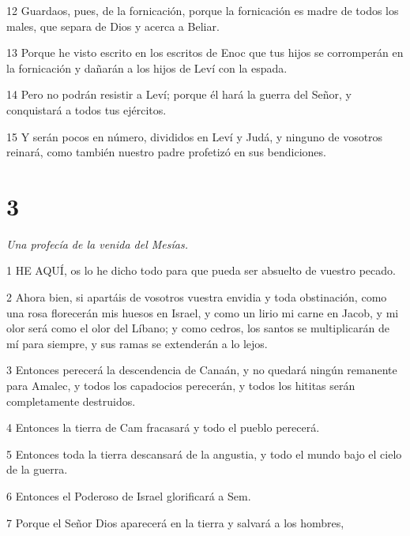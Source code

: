 \par 12 Guardaos, pues, de la fornicación, porque la fornicación es madre de todos los males, que separa de Dios y acerca a Beliar.

\par 13 Porque he visto escrito en los escritos de Enoc que tus hijos se corromperán en la fornicación y dañarán a los hijos de Leví con la espada.

\par 14 Pero no podrán resistir a Leví; porque él hará la guerra del Señor, y conquistará a todos tus ejércitos.

\par 15 Y serán pocos en número, divididos en Leví y Judá, y ninguno de vosotros reinará, como también nuestro padre profetizó en sus bendiciones.

\chapter{3}

\par \textit{Una profecía de la venida del Mesías.}

\par 1 HE AQUÍ, os lo he dicho todo para que pueda ser absuelto de vuestro pecado.

\par 2 Ahora bien, si apartáis de vosotros vuestra envidia y toda obstinación, como una rosa florecerán mis huesos en Israel, y como un lirio mi carne en Jacob, y mi olor será como el olor del Líbano; y como cedros, los santos se multiplicarán de mí para siempre, y sus ramas se extenderán a lo lejos.

\par 3 Entonces perecerá la descendencia de Canaán, y no quedará ningún remanente para Amalec, y todos los capadocios perecerán, y todos los hititas serán completamente destruidos.

\par 4 Entonces la tierra de Cam fracasará y todo el pueblo perecerá.

\par 5 Entonces toda la tierra descansará de la angustia, y todo el mundo bajo el cielo de la guerra.

\par 6 Entonces el Poderoso de Israel glorificará a Sem.

\par 7 Porque el Señor Dios aparecerá en la tierra y salvará a los hombres,

